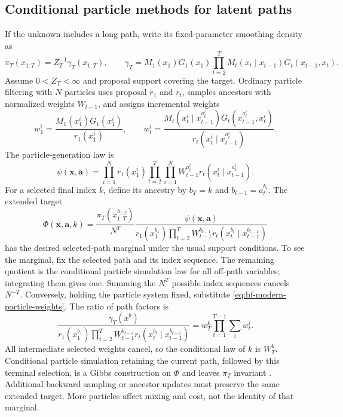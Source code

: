 \subsection{Conditional particle methods for latent paths}

If the unknown includes a long path, write its fixed-parameter smoothing
density as
\begin{equation}
 \pi_T(x_{1:T})=Z_T^{-1}\gamma_T(x_{1:T}),\qquad
 \gamma_T=M_1(x_1)G_1(x_1)
             \prod_{t=2}^T M_t(x_t\mid x_{t-1})G_t(x_{t-1},x_t).
 \label{eq:bf-modern-particle-target}
\end{equation}
Assume $0<Z_T<\infty$ and proposal support covering the target.
Ordinary particle filtering with $N$ particles uses proposal $r_1$ and
$r_t$, samples ancestors with normalized weights $W_{t-1}$, and assigns
incremental weights
\begin{equation}
 w_1^i=\frac{M_1(x_1^i)G_1(x_1^i)}{r_1(x_1^i)},\qquad
 w_t^i=\frac{M_t(x_t^i\mid x_{t-1}^{a_t^i})
                    G_t(x_{t-1}^{a_t^i},x_t^i)}
                   {r_t(x_t^i\mid x_{t-1}^{a_t^i})}.
 \label{eq:bf-modern-particle-weights}
\end{equation}
The particle-generation law is
\begin{equation}
 \psi(\mathbf x,\mathbf a)
 =\prod_{i=1}^N r_1(x_1^i)
   \prod_{t=2}^T\prod_{i=1}^N
       W_{t-1}^{a_t^i}r_t(x_t^i\mid x_{t-1}^{a_t^i}).
 \label{eq:bf-modern-particle-law}
\end{equation}
For a selected final index $k$, define its ancestry by $b_T=k$ and
$b_{t-1}=a_t^{b_t}$. The extended target
\begin{equation}
 \Phi(\mathbf x,\mathbf a,k)=
 \frac{\pi_T(x_{1:T}^{b_{1:T}})}{N^T}
 \frac{\psi(\mathbf x,\mathbf a)}
 {r_1(x_1^{b_1})\prod_{t=2}^T
       W_{t-1}^{b_{t-1}}r_t(x_t^{b_t}\mid x_{t-1}^{b_{t-1}})}
 \label{eq:bf-modern-particle-extended}
\end{equation}
has the desired selected-path marginal under the usual support conditions.
To see the marginal, fix the selected path and its index sequence. The
remaining quotient is the conditional particle simulation law for all
off-path variables; integrating them gives one. Summing the $N^T$ possible
index sequences cancels $N^{-T}$. Conversely, holding the particle system
fixed, substitute \eqref{eq:bf-modern-particle-weights}. The ratio of path
factors is
\begin{equation}
 \frac{\gamma_T(x^b)}
 {r_1(x_1^{b_1})\prod_{t=2}^T
   W_{t-1}^{b_{t-1}}r_t(x_t^{b_t}\mid x_{t-1}^{b_{t-1}})}
       =w_T^k\prod_{t=1}^{T-1}\sum_i w_t^i.
 \label{eq:bf-modern-particle-terminal-weight}
\end{equation}
All intermediate selected weights cancel, so the conditional law of $k$ is
$W_T^k$. Conditional particle simulation retaining the current path, followed
by this terminal selection, is a Gibbs construction on $\Phi$ and leaves
$\pi_T$ invariant \citep[Sections 4.2--4.5, equation (31)]{andrieu2010particle}. Additional backward sampling
or ancestor updates must preserve the same extended target. More particles
affect mixing and cost, not the identity of that marginal.

